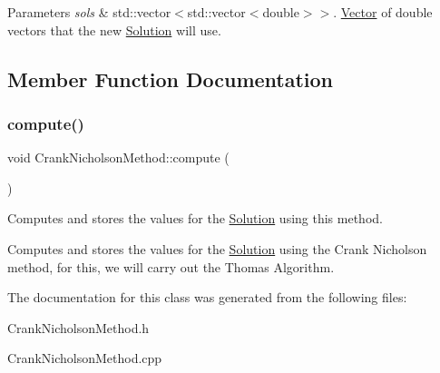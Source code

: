 \begin{DoxyParams}{Parameters}
{\em sols} & std\+::vector$<$std\+::vector$<$double$>$$>$. \hyperlink{class_vector}{Vector} of double vectors that the new \hyperlink{class_solution}{Solution} will use. \\
\hline
\end{DoxyParams}


\subsection{Member Function Documentation}
\mbox{\label{class_crank_nicholson_method_a10558e5238673e11a76b4e10e8c588b4}} 
\subsubsection{\texorpdfstring{compute()}{compute()}}
{\footnotesize\ttfamily void Crank\+Nicholson\+Method\+::compute (\begin{DoxyParamCaption}{ }\end{DoxyParamCaption})}

Computes and stores the values for the \hyperlink{class_solution}{Solution} using this method.

Computes and stores the values for the \hyperlink{class_solution}{Solution} using the Crank Nicholson method, for this, we will carry out the Thomas Algorithm. 

The documentation for this class was generated from the following files\+:\begin{DoxyCompactItemize}
\item 
Crank\+Nicholson\+Method.\+h\item 
Crank\+Nicholson\+Method.\+cpp\end{DoxyCompactItemize}
